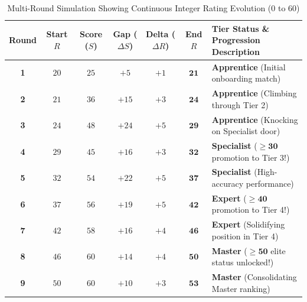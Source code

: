 \begin{table}[htbp]
\centering
\scriptsize
\begin{tabular}{|c|c|c|c|c|c|p{5.4cm}|}
\hline
\rowcolor{primaryBlue!15}
\textbf{Round} & \textbf{Start $R$} & \textbf{Score ($S$)} & \textbf{Gap ($\Delta S$)} & \textbf{Delta ($\Delta R$)} & \textbf{End $R$} & \textbf{Tier Status \& Progression Description} \\ \hline
\textbf{1} & $20$ & $25$ & $+5$ & $+1$ & $\mathbf{21}$ & \textbf{Apprentice} (Initial onboarding match) \\ \hline
\textbf{2} & $21$ & $36$ & $+15$ & $+3$ & $\mathbf{24}$ & \textbf{Apprentice} (Climbing through Tier 2) \\ \hline
\textbf{3} & $24$ & $48$ & $+24$ & $+5$ & $\mathbf{29}$ & \textbf{Apprentice} (Knocking on Specialist door) \\ \hline
\textbf{4} & $29$ & $45$ & $+16$ & $+3$ & $\mathbf{32}$ & \textbf{Specialist} ($\mathbf{\ge 30}$ promotion to Tier 3!) \\ \hline
\textbf{5} & $32$ & $54$ & $+22$ & $+5$ & $\mathbf{37}$ & \textbf{Specialist} (High-accuracy performance) \\ \hline
\textbf{6} & $37$ & $56$ & $+19$ & $+5$ & $\mathbf{42}$ & \textbf{Expert} ($\mathbf{\ge 40}$ promotion to Tier 4!) \\ \hline
\textbf{7} & $42$ & $58$ & $+16$ & $+4$ & $\mathbf{46}$ & \textbf{Expert} (Solidifying position in Tier 4) \\ \hline
\textbf{8} & $46$ & $60$ & $+14$ & $+4$ & $\mathbf{50}$ & \textbf{Master} ($\mathbf{\ge 50}$ elite status unlocked!) \\ \hline
\textbf{9} & $50$ & $60$ & $+10$ & $+3$ & $\mathbf{53}$ & \textbf{Master} (Consolidating Master ranking) \\ \hline
\end{tabular}
\caption{Multi-Round Simulation Showing Continuous Integer Rating Evolution ($0$ to $60$)}
\end{table}

